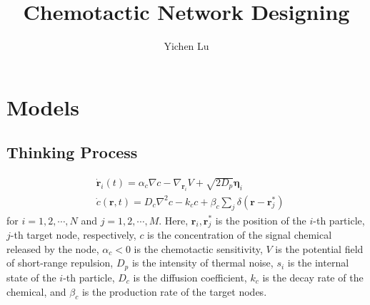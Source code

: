 \documentclass{article}
\title{\textbf{Chemotactic Network Designing}}
\author{Yichen Lu}
\begin{document}
\maketitle

\tableofcontents

\newpage
\section{Models}

\subsection{Thinking Process}

\begin{subequations}
    \begin{align}
        &\dot{\mathbf{r}}_i\left( t \right) =\alpha_c \nabla c-\nabla _{\mathbf{r}_i}V+\sqrt{2D_p}\boldsymbol{\eta }_i\\
        &\dot{c}\left( \mathbf{r},t \right) =D_c\nabla ^2c-k_cc+\beta _c\sum\nolimits_j^{}{\delta \left( \mathbf{r}-\mathbf{r}_{j}^{*} \right)}
    \end{align}
\end{subequations}
for $i=1,2,\cdots,N$ and $j=1,2,\cdots,M$. Here, $\mathbf{r}_i, \mathbf{r}_j^*$ is the position of the $i$-th particle, $j$-th target node, respectively, $c$ is the concentration of the signal chemical released by the node, $\alpha _c<0$ is the chemotactic sensitivity, $V$ is the potential field of short-range repulsion, $D_p$ is the intensity of thermal noise, $s_i$ is the internal state of the $i$-th particle, $D_c$ is the diffusion coefficient, $k_c$ is the decay rate of the chemical, and $\beta _c$ is the production rate of the target nodes. 
\end{document}
